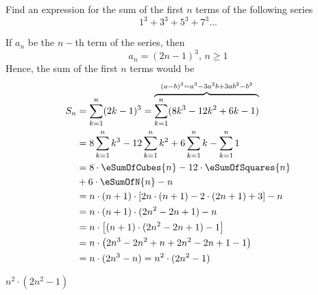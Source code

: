 

\question[3] Find an expression for the sum of the first $n$ terms of the following series 
\[ 1^3 + 3^3 + 5^3 + 7^3 \ldots \]

\begin{solution}[\halfpage]
  If $a_n$ be the $n-$th term of the series, then 
  \[ a_n = (2n-1)^3,\, n\geq 1 \] 
	Hence, the sum of the first $n$ terms would be 
	\begin{align}
		S_n &= \sum_{k=1}^{n}(2k-1)^3 = \overbrace{\sum_{k=1}^n (8k^3 - 12k^2 + 6k - 1)}^{(a-b)^3 = a^3-3a^2b+3ab^2-b^3} \\
    &= 8\sum_{k=1}^{n}k^3 - 12 \sum_{k=1}^{n} k^2 + 6 \sum_{k=1}^{n} k - \sum_{k=1}^{n} 1 \\
		&= 8\cdot\eSumOfCubes{n} - 12\cdot\eSumOfSquares{n} \nonumber\\
    & + 6\cdot\eSumOfN{n} - n \\
		&= n\cdot(n+1)\cdot[2n\cdot(n+1) - 2\cdot(2n+1) + 3 ] - n \\
		&= n\cdot(n+1)\cdot(2n^2-2n+1) - n \\
    &= n\cdot\left[ (n+1)\cdot(2n^2-2n+1) - 1\right] \\
    &= n\cdot\left( 2n^3-2n^2+n + 2n^2-2n + 1 -1\right) \\
    &= n\cdot(2n^3-n) = n^2\cdot(2n^2-1)
	\end{align}
\end{solution}
 
\ifprintanswers\begin{codex}$n^2\cdot(2n^2-1)$\end{codex}\fi
